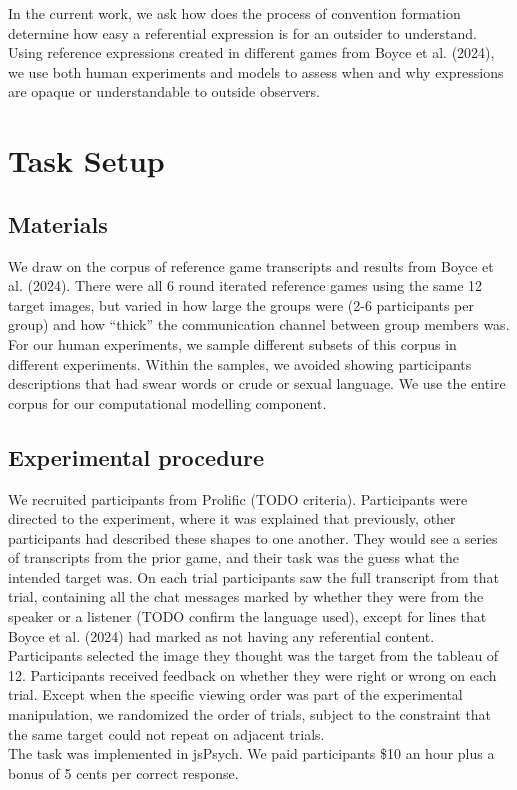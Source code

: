 \documentclass[10pt, letterpaper]{article}
\begin{document}
In the current work, we ask how does the process of convention formation
determine how easy a referential expression is for an outsider to
understand. Using reference expressions created in different games from
Boyce et al. (2024), we use both human experiments and models to assess
when and why expressions are opaque or understandable to outside
observers.

\section{Task Setup}\label{task-setup}

\subsection{Materials}\label{materials}

We draw on the corpus of reference game transcripts and results from
Boyce et al. (2024). There were all 6 round iterated reference games
using the same 12 target images, but varied in how large the groups were
(2-6 participants per group) and how ``thick'' the communication channel
between group members was. For our human experiments, we sample
different subsets of this corpus in different experiments. Within the
samples, we avoided showing participants descriptions that had swear
words or crude or sexual language. We use the entire corpus for our
computational modelling component.

\subsection{Experimental procedure}\label{experimental-procedure}

We recruited participants from Prolific (TODO criteria). Participants
were directed to the experiment, where it was explained that previously,
other participants had described these shapes to one another. They would
see a series of transcripts from the prior game, and their task was the
guess what the intended target was. On each trial participants saw the
full transcript from that trial, containing all the chat messages marked
by whether they were from the speaker or a listener (TODO confirm the
language used), except for lines that Boyce et al. (2024) had marked as
not having any referential content. Participants selected the image they
thought was the target from the tableau of 12. Participants received
feedback on whether they were right or wrong on each trial. Except when
the specific viewing order was part of the experimental manipulation, we
randomized the order of trials, subject to the constraint that the same
target could not repeat on adjacent trials.\\
The task was implemented in jsPsych. We paid participants \$10 an hour
plus a bonus of 5 cents per correct response.
\end{document}
